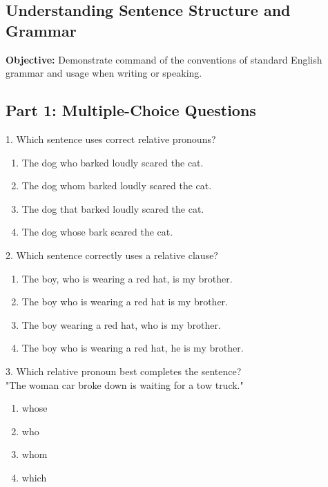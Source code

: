 \documentclass[12pt]{article}
\begin{document}
\subsection*{Understanding Sentence Structure and Grammar}
\onehalfspacing

\begin{tcolorbox}[colframe=black!40, colback=gray!0, title=Learning Objective]
\textbf{Objective:} Demonstrate command of the conventions of standard English grammar and usage when writing or speaking.
\end{tcolorbox}

\subsection*{Part 1: Multiple-Choice Questions}

1. Which sentence uses correct relative pronouns?\\
\begin{enumerate}[label=\Alph*.]
    \item The dog who barked loudly scared the cat.  
    \item The dog whom barked loudly scared the cat.  
    \item The dog that barked loudly scared the cat.  
    \item The dog whose bark scared the cat.  
\end{enumerate}

\vspace{1cm}

2. Which sentence correctly uses a relative clause?\\
\begin{enumerate}[label=\Alph*.]
    \item The boy, who is wearing a red hat, is my brother.  
    \item The boy who is wearing a red hat is my brother.  
    \item The boy wearing a red hat, who is my brother.  
    \item The boy who is wearing a red hat, he is my brother.  
\end{enumerate}

\vspace{1cm}

3. Which relative pronoun best completes the sentence?\\
"The woman \underline{\hspace{4cm}} car broke down is waiting for a tow truck."\\
\begin{enumerate}[label=\Alph*.]
    \item whose  
    \item who  
    \item whom  
    \item which  
\end{enumerate}
\end{document}
